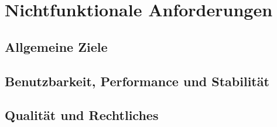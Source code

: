\section{Nichtfunktionale Anforderungen}

\subsection{Allgemeine Ziele}
\begin{requirements}

\end{requirements}

\subsection{Benutzbarkeit, Performance und Stabilität}
\begin{requirements}

\end{requirements}

\subsection{Qualität und Rechtliches}
\begin{requirements}

\end{requirements}
